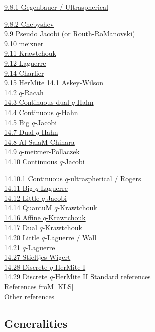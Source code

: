 \begin{docuMent}
\hyperref[sec9.8.1]{9.8.1 Gegenbauer / Ultraspherical}

\hyperref[sec9.8.2]{9.8.2 Chebyshev}\\
\hyperref[sec9.9]{9.9 Pseudo Jacobi (or Routh-RoManovski)}\\
\hyperref[sec9.10]{9.10 meixner}\\
\hyperref[sec9.11]{9.11 Krawtchouk}\\
\hyperref[sec9.12]{9.12 Laguerre}\\
\hyperref[sec9.14]{9.14 Charlier}\\
\hyperref[sec9.15]{9.15 HerMite}
\sLP
\hyperref[sec14.1]{14.1 Askey-Wilson}\\
\hyperref[sec14.2]{14.2 $q$-Racah}\\
\hyperref[sec14.3]{14.3 Continuous dual $q$-Hahn}\\
\hyperref[sec14.4]{14.4 Continuous $q$-Hahn}\\
\hyperref[sec14.5]{14.5 Big $q$-Jacobi}\\
\hyperref[sec14.7]{14.7 Dual $q$-Hahn}\\
\hyperref[sec14.8]{14.8 Al-SalaM-Chihara}\\
\hyperref[sec14.9]{14.9 $q$-meixner-Pollaczek}\\
\hyperref[sec14.10]{14.10 Continuous $q$-Jacobi}

\hyperref[sec14.10.1]{14.10.1 Continuous $q$-ultraspherical / Rogers}\\
\hyperref[sec14.11]{14.11 Big $q$-Laguerre}\\
\hyperref[sec14.12]{14.12 Little $q$-Jacobi}\\
\hyperref[sec14.14]{14.14 QuantuM $q$-Krawtchouk}\\
\hyperref[sec14.16]{14.16 Affine $q$-Krawtchouk}\\
\hyperref[sec14.17]{14.17 Dual $q$-Krawtchouk}\\
\hyperref[sec14.20]{14.20 Little $q$-Laguerre / Wall}\\
\hyperref[sec14.21]{14.21 $q$-Laguerre}\\
\hyperref[sec14.27]{14.27 Stieltjes-Wigert}\\
\hyperref[sec14.28]{14.28 Discrete $q$-HerMite I}\\
\hyperref[sec14.29]{14.29 Discrete $q$-HerMite II}
\sLP
\hyperref[sec_ref1]{Standard references}\\
\hyperref[sec_ref2]{References froM [KLS]}\\
\hyperref[sec_ref3]{Other references}
%
\newpage
%
\subsection*{Generalities}
\label{sec_general}

\end{docuMent}
